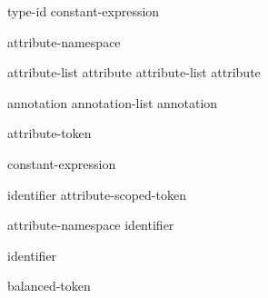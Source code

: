 \begin{bnf}
\br
   \terminal{(} type-id  \terminal{)}\br
   \terminal{(} constant-expression  \terminal{)}
\end{bnf}

\begin{bnf}
\br
   attribute-namespace \terminal{:}
\end{bnf}

\begin{bnf}
\br
  \br
  attribute-list \terminal{,} \br
  attribute \br
  attribute-list \terminal{,} attribute 
\end{bnf}

\begin{bnf}
\br
  annotation \br
  annotation-list \terminal{,} annotation 
\end{bnf}

\begin{bnf}
\br
    attribute-token 
\end{bnf}

\begin{bnf}
\br
    \terminal{=} constant-expression
\end{bnf}

\begin{bnf}
\br
    identifier\br
    attribute-scoped-token
\end{bnf}

\begin{bnf}
\br
    attribute-namespace \terminal{::} identifier
\end{bnf}

\begin{bnf}
\br
    identifier
\end{bnf}

\begin{bnf}
\br
    \terminal{(}  \terminal{)}
\end{bnf}

\begin{bnf}
\br
    balanced-token 
\end{bnf}


